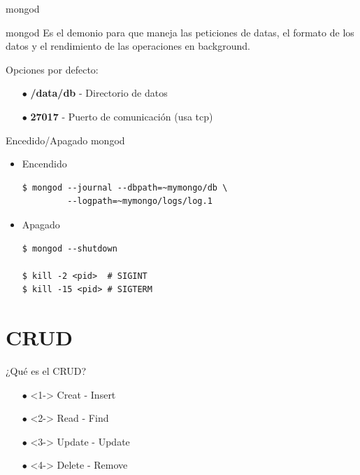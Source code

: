 \documentclass[12pt]{beamer}
\begin{document}
\begin{frame}[fragile]{mongod}
  \begin{block}{mongod}
    Es el demonio para que maneja las peticiones de datas, el formato de los
    datos y el rendimiento de las operaciones en background.
  \end{block}

  Opciones por defecto:
  
  \begin{itemize}
      \item[$\bullet$] \textbf{/data/db} - Directorio de datos
      \item[$\bullet$] \textbf{27017} - Puerto de comunicación (usa tcp)
  \end{itemize}
\end{frame}


\begin{frame}[fragile]{Encedido/Apagado mongod}
  
  \begin{itemize}
    \item Encendido

    \begin{verbatim}
$ mongod --journal --dbpath=~mymongo/db \
         --logpath=~mymongo/logs/log.1
    \end{verbatim}
    
    \item Apagado
      \begin{verbatim}
$ mongod --shutdown
      
$ kill -2 <pid>  # SIGINT
$ kill -15 <pid> # SIGTERM
      \end{verbatim}
  \end{itemize}
\end{frame}

\section{CRUD}
\begin{frame}{¿Qué es el CRUD?}
  
  \begin{itemize}
  \item[$\bullet$]<1->  Creat - Insert

  \item[$\bullet$]<2->  Read - Find

  \item[$\bullet$]<3->  Update - Update

  \item[$\bullet$]<4->  Delete - Remove 
  \end{itemize}
\end{frame}
\end{document}
